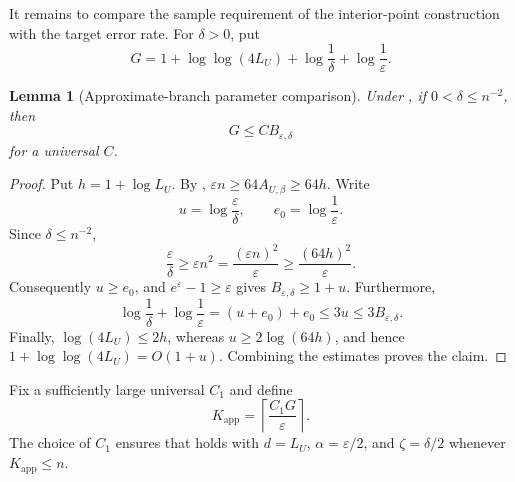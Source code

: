 \documentclass[11pt]{article}
\newtheorem{lemma}{Lemma}[section]
\begin{document}
It remains to compare the sample requirement of the interior-point
construction with the target error rate.  For $\delta>0$, put
\begin{equation}
 G=1+\log\log(4L_U)+\log\frac1\delta+\log\frac1\varepsilon.
 \label{eq:G-definition}
\end{equation}

\begin{lemma}[Approximate-branch parameter comparison]
\label{lem:parameter-comparison}
Under , if $0<\delta\le n^{-2}$, then
\begin{equation}
 G\le C B_{\varepsilon,\delta}
 \label{eq:G-versus-B}
\end{equation}
for a universal $C$.
\end{lemma}

\begin{proof}
Put $h=1+\log L_U$.  By ,
$\varepsilon n\ge64A_{U,\beta}\ge64h$.  Write
\[
 u=\log\frac\varepsilon\delta,
 \qquad
 e_0=\log\frac1\varepsilon.
\]
Since $\delta\le n^{-2}$,
\[
 \frac\varepsilon\delta
 \ge\varepsilon n^2
 =\frac{(\varepsilon n)^2}{\varepsilon}
 \ge\frac{(64h)^2}{\varepsilon}.
\]
Consequently $u\ge e_0$, and $e^\varepsilon-1\ge\varepsilon$ gives
$B_{\varepsilon,\delta}\ge1+u$.  Furthermore,
\[
 \log\frac1\delta+\log\frac1\varepsilon
 =(u+e_0)+e_0\le3u\le3B_{\varepsilon,\delta}.
\]
Finally, $\log(4L_U)\le2h$, whereas $u\ge2\log(64h)$, and hence
$1+\log\log(4L_U)=O(1+u)$.  Combining the estimates proves the claim.
\end{proof}

Fix a sufficiently large universal $C_1$ and define
\begin{equation}
 K_{\mathrm{app}}=\left\lceil\frac{C_1G}{\varepsilon}\right\rceil.
 \label{eq:approx-k}
\end{equation}
The choice of $C_1$ ensures that  holds with
$d=L_U$, $\alpha=\varepsilon/2$, and $\zeta=\delta/2$ whenever
$K_{\mathrm{app}}\le n$.
\end{document}
